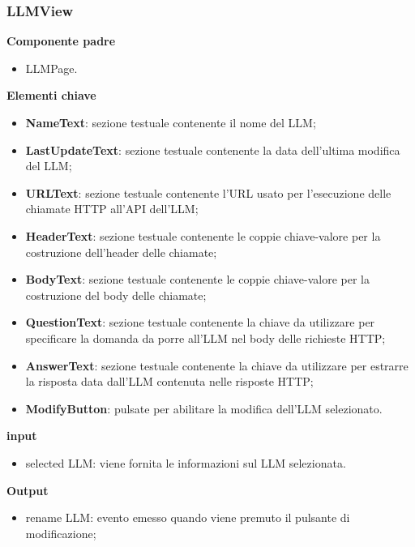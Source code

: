 \subsubsection{LLMView}
\textbf{Componente padre}
\begin{itemize}
    \item LLMPage.
\end{itemize}
\textbf{Elementi chiave}
\begin{itemize}
    \item \textbf{NameText}: sezione testuale contenente il nome del LLM; 
    \item \textbf{LastUpdateText}: sezione testuale contenente la data dell'ultima modifica del LLM;
    \item \textbf{URLText}: sezione testuale contenente l’URL usato per l’esecuzione delle chiamate HTTP all’API dell’LLM;
    \item \textbf{HeaderText}: sezione testuale contenente le coppie chiave-valore per la costruzione dell’header delle chiamate;
    \item \textbf{BodyText}: sezione testuale contenente le coppie chiave-valore per la costruzione del body delle chiamate;
    \item \textbf{QuestionText}: sezione testuale contenente la chiave da utilizzare per specificare la domanda da porre all’LLM nel body delle richieste HTTP;
    \item \textbf{AnswerText}: sezione testuale contenente la chiave da utilizzare per estrarre la risposta data dall’LLM contenuta nelle risposte HTTP;
    \item \textbf{ModifyButton}: pulsate per abilitare la modifica dell'LLM selezionato.
\end{itemize}
\textbf{input}
\begin{itemize}
    \item selected LLM: viene fornita le informazioni sul LLM selezionata.
\end{itemize}
\textbf{Output}
\begin{itemize}
    \item rename LLM: evento emesso quando viene premuto il pulsante di modificazione;
\end{itemize}

